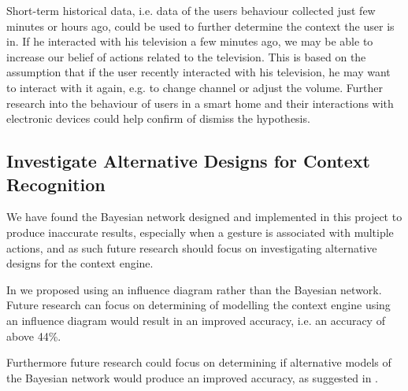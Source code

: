 Short-term historical data, i.e. data of the users behaviour collected just few minutes or hours ago, could be used to further determine the context the user is in. If he interacted with his television a few minutes ago, we may be able to increase our belief of actions related to the television. This is based on the assumption that if the user recently interacted with his television, he may want to interact with it again, e.g. to change channel or adjust the volume. Further research into the behaviour of users in a smart home and their interactions with electronic devices could help confirm of dismiss the hypothesis.

\subsection{Investigate Alternative Designs for Context Recognition}

We have found the Bayesian network designed and implemented in this project to produce inaccurate results, especially when a gesture is associated with multiple actions, and as such future research should focus on investigating alternative designs for the context engine.

In  we proposed using an influence diagram rather than the Bayesian network. Future research can focus on determining of modelling the context engine using an influence diagram would result in an improved accuracy, i.e. an accuracy of above 44\%.

Furthermore future research could focus on determining if alternative models of the Bayesian network would produce an improved accuracy, as suggested in .


